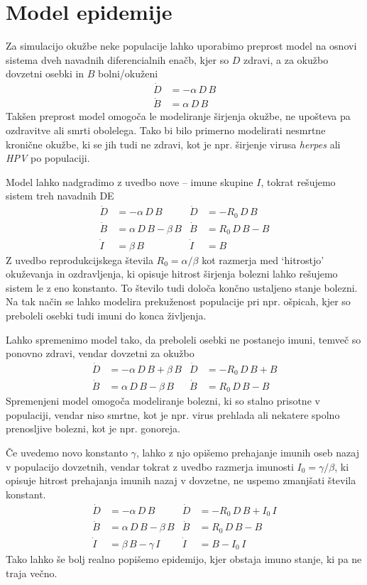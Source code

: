 \section{Model epidemije}

Za simulacijo okužbe neke populacije lahko uporabimo preprost model na osnovi sistema dveh navadnih diferencialnih enačb, kjer so $D$ zdravi, a za okužbo dovzetni osebki in $B$ bolni/okuženi
\begin{align}\label{eqn:1}
    \dot D &= -\alpha \, D \, B \\ \nonumber
    \dot B &= \alpha \, D \, B
\end{align}
Takšen preprost model omogoča le modeliranje širjenja okužbe, ne upošteva pa ozdravitve ali smrti obolelega. Tako bi bilo primerno modelirati nesmrtne kronične okužbe, ki se jih tudi ne zdravi, kot je npr. širjenje virusa \textit{herpes} ali \textit{HPV} po populaciji.

Model lahko nadgradimo z uvedbo nove -- imune skupine $I$, tokrat rešujemo sistem treh navadnih DE
\begin{align}\label{eqn:2}
    \dot D &= -\alpha \, D \, B & \dot D &= -R_0 \, D \, B \\ \nonumber
    \dot B &= \alpha \, D \, B - \beta \, B  & \dot B &= R_0 \, D \, B - B\\ \nonumber
    \dot I &= \beta \, B  & \dot I &= B
\end{align}
Z uvedbo reprodukcijskega števila $R_0 = \alpha / \beta$ kot razmerja med ‘hitrostjo’ okuževanja in ozdravljenja, ki opisuje hitrost širjenja bolezni lahko rešujemo sistem le z eno konstanto. To število tudi določa končno ustaljeno stanje bolezni. Na tak način se lahko modelira prekuženost populacije pri npr. ošpicah, kjer so preboleli osebki tudi imuni do konca življenja.

Lahko spremenimo model tako, da preboleli osebki ne postanejo imuni, temveč so ponovno zdravi, vendar dovzetni za okužbo
\begin{align}\label{eqn:3}
    \dot D &= -\alpha \, D \, B + \beta \, B & \dot D &= -R_0 \, D \, B + B \\ \nonumber
    \dot B &= \alpha \, D \, B - \beta \, B & \dot B &= R_0 \, D \, B - B
\end{align}
Spremenjeni model omogoča modeliranje  bolezni, ki so stalno prisotne v populaciji, vendar niso smrtne, kot je npr. virus prehlada ali nekatere spolno prenosljive bolezni, kot je npr. gonoreja.

Če uvedemo novo konstanto $\gamma$, lahko z njo opišemo prehajanje imunih oseb nazaj v populacijo dovzetnih, vendar tokrat z uvedbo razmerja imunosti $I_0 = \gamma / \beta$, ki opisuje hitrost prehajanja imunih nazaj v dovzetne, ne uspemo zmanjšati števila konstant.
\begin{align}\label{eqn:4}
    \dot D &= -\alpha \, D \, B & \dot D &= -R_0 \, D \, B + I_0 \, I\\ \nonumber
    \dot B &= \alpha \, D \, B - \beta \, B & \dot B &= R_0 \, D \, B -B \\ \nonumber
    \dot I &= \beta \, B - \gamma \, I & \dot I &= B - I_0 \, I 
\end{align}
Tako lahko še bolj realno popišemo epidemijo, kjer obstaja imuno stanje, ki pa ne traja večno.

